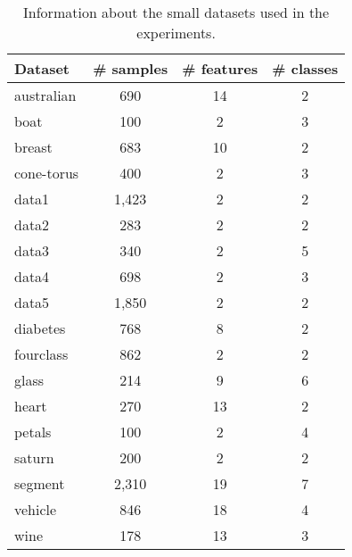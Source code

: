 \begin{table}[!htb]		    
\begin{center}
\caption{\label{tab.datasets1}Information about the small datasets used in the experiments.}
\small
\begin{tabular}{  l | c | c | c }
    \textbf{Dataset}   & \textbf{\# samples} & \textbf{\# features}  & \textbf{\# classes}\\ \hline \hline
    australian        &      690           &       14             &    2 \\
    boat              &      100           &       2              &    3 \\
    breast            &      683           &       10             &    2 \\      
    cone-torus       &      400           &       2              &    3 \\
    data1             &      1,423          &       2              &    2 \\
    data2             &      283           &       2              &    2 \\
    data3             &      340           &       2              &    5 \\
    data4             &      698           &       2              &    3 \\
    data5             &      1,850          &       2              &    2 \\
    diabetes          &      768           &       8              &    2 \\
    fourclass         &      862           &       2              &    2 \\
    glass             &	 214	       &       9              &    6 \\ 		        
    heart             &      270           &       13             &    2 \\   
    petals            &      100           &       2              &    4 \\  
    saturn            &      200           &       2              &    2 \\
    segment           &      2,310          &       19             &    7 \\			
    vehicle           &      846           &       18             &    4 \\ 
    wine              &      178           &       13             &    3 \\ \hline  		 
\end{tabular}		    	    
\end{center}		    
\end{table}

